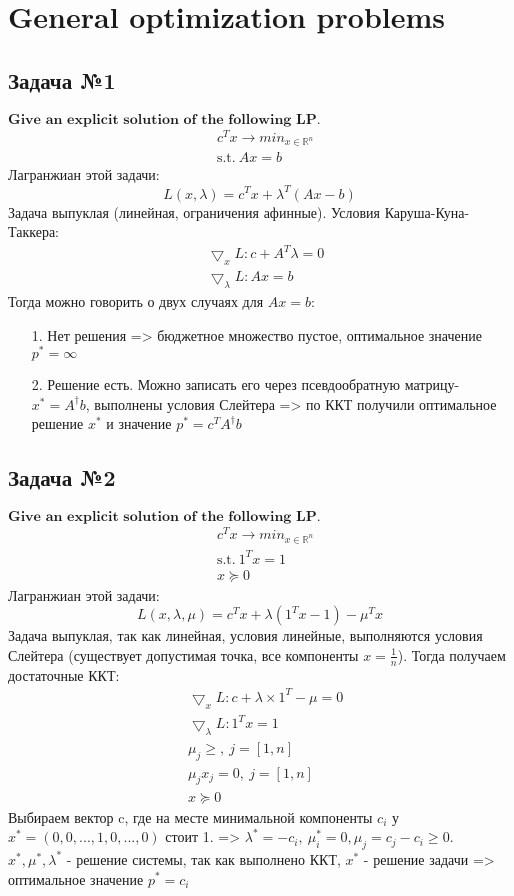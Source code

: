 \documentclass[12pt,letterpaper]{article}
\begin{document}
\section{General optimization problems}

\subsection*{Задача №1}
$\textbf{Give an explicit solution of the following LP.}$
$$ 
\begin{aligned}
&c^Tx\rightarrow min_{x\in \mathbb{R}^n}\\ 
&\text{s.t.}\ Ax=b
\end{aligned}
$$
Лагранжиан этой задачи:
$$ L(x,\lambda)=c^Tx+\lambda^T(Ax-b)$$
Задача выпуклая (линейная, ограничения афинные).
Условия Каруша-Куна-Таккера:
$$ 
\begin{aligned}
&\bigtriangledown_x L: c+A^T\lambda=0\\ 
&\bigtriangledown_\lambda L: Ax=b
\end{aligned}
$$
Тогда можно говорить о двух случаях для $Ax=b$:
\begin{itemize}
	\item[1. ] Нет решения => бюджетное множество пустое, оптимальное значение $p^*=\infty$
	\item[2. ] Решение есть. Можно записать его через псевдообратную матрицу- $x^*=A^\dagger b$, выполнены условия Слейтера => по ККТ получили оптимальное решение $x^*$ и значение $p^*=c^T A^\dagger b$
\end{itemize}



\subsection*{Задача №2}
$\textbf{Give an explicit solution of the following LP.}$
$$ 
\begin{aligned}
&c^Tx\rightarrow min_{x\in \mathbb{R}^n}\\ 
&\text{s.t.}\ 1^Tx=1\\
&x\succcurlyeq0
\end{aligned}
$$
Лагранжиан этой задачи:
$$ L(x,\lambda,\mu)=c^T x+\lambda(1^T x-1)-\mu^T x  $$
Задача выпуклая, так как линейная, условия линейные, выполняются условия Слейтера (существует допустимая точка, все компоненты $x =\frac{1}{n}$). Тогда получаем достаточные ККТ:
$$
\begin{aligned}
&\bigtriangledown_x L: c+\lambda\times1^T-\mu=0\\ 
&\bigtriangledown_\lambda L: 1^Tx=1\\
&\mu_j\geq,\ j=[1,n]\\
&\mu_j x_j=0,\ j=[1,n]\\
&x\succeq0
\end{aligned}
$$ 
Выбираем вектор c, где на месте минимальной компоненты $c_i$ у $x^*=(0,0,...,1,0,...,0)$ стоит 1. => $\lambda^*=-c_i,\ \mu^*_i=0, \mu_j=c_j-c_i\geq0$.\\
$x^*, \mu^*, \lambda^*$ - решение системы, так как выполнено ККТ, $x^*$ - решение задачи => оптимальное значение $p^*=c_i$
\end{document}
